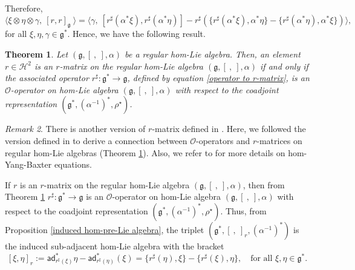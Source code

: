 \documentclass[a4paper,11pt]{amsart}
\theoremstyle{plain}
\newtheorem{theorem}{Theorem}[section]
\theoremstyle{definition}
\theoremstyle{remark}
\newtheorem{remark}[theorem]{Remark}
\numberwithin{equation}{section}
\begin{document}
Therefore, 
$$\big\langle \xi\otimes \eta\otimes \gamma,~[r,r]_{\mathfrak{g}}~\big\rangle= \Big\langle \gamma,~[r^{\sharp}(\alpha^*\xi),r^{\sharp}(\alpha^*\eta)]-r^{\sharp}(\{r^{\sharp}(\alpha^*\xi),\alpha^*\eta\}-\{r^{\sharp}(\alpha^*\eta),\alpha^*\xi\})\Big\rangle,$$
for all $\xi,\eta,\gamma\in\mathfrak{g}^*$. Hence, we have the following result.

\begin{theorem}\label{correspondence theorem}
Let $(\mathfrak{g},[~,~],\alpha)$ be a regular hom-Lie algebra. Then, an element $r\in \mathcal{H}^2$ is an $r$-matrix on the regular hom-Lie algebra $(\mathfrak{g},[~,~],\alpha)$ if and only if the associated operator $r^{\sharp}:\mathfrak{g}^*\rightarrow \mathfrak{g}$, defined by equation \eqref{operator to r-matrix}, is an $\mathcal{O}$-operator on hom-Lie algebra $(\mathfrak{g},[~,~],\alpha)$ with respect to the coadjoint representation $(\mathfrak{g}^*,(\alpha^{-1})^*,\rho^\star)$.
\end{theorem}

\begin{remark}
There is another version of $r$-matrix defined in \cite{hom-Liebi}. Here, we followed the version defined in \cite{Yau1} to derive a connection between $\mathcal{O}$-operators and $r$-matrices on regular hom-Lie algebras (Theorem \ref{correspondence theorem}). Also, we refer to \cite{Yau1} for more details on hom-Yang-Baxter equations.
\end{remark}


If $r$ is an $r$-matrix on the regular hom-Lie algebra $(\mathfrak{g},[~,~],\alpha)$, then from Theorem \ref{correspondence theorem} $r^\sharp:\mathfrak{g}^*\rightarrow \mathfrak{g}$ is an $\mathcal{O}$-operator on hom-Lie algebra $(\mathfrak{g},[~,~],\alpha)$ with respect to the coadjoint representation $(\mathfrak{g}^*,(\alpha^{-1})^*,\rho^\star)$. Thus, from Proposition \ref{induced hom-pre-Lie algebra}, the triplet $(\mathfrak{g}^*,[~,~]_r,(\alpha^{-1})^*)$ is the induced sub-adjacent hom-Lie algebra with the bracket 
$$[\xi,\eta]_{r}:=\mathsf{ad}^*_{r^{\sharp}(\xi)}\eta-\mathsf{ad}^*_{r^{\sharp}(\eta)}(\xi)=\{r^{\sharp}(\eta),\xi\}-\{r^{\sharp}(\xi),\eta\},\quad\mbox{for all }\xi,\eta\in\mathfrak{g}^*.$$
\end{document}
